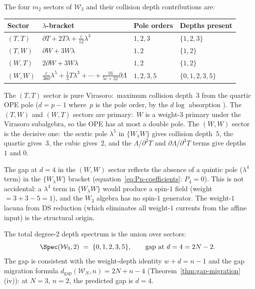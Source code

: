 \begin{computation}
\label{comp:w3-depth-degree-2}
%
The four $m_2$ sectors of $\mathcal{W}_3$ and their collision
depth contributions are:
\begin{center}
\small
\renewcommand{\arraystretch}{1.3}
\begin{tabular}{llll}
\toprule
\textbf{Sector} & \textbf{$\lambda$-bracket}
 & \textbf{Pole orders} & \textbf{Depths present} \\
\midrule
$(T,T)$ & $\partial T + 2T\lambda + \tfrac{c}{12}\lambda^3$
 & $1, 2, 3$ & $\{1, 2, 3\}$ \\
$(T,W)$ & $\partial W + 3W\lambda$
 & $1, 2$ & $\{1, 2\}$ \\
$(W,T)$ & $2\partial W + 3W\lambda$
 & $1, 2$ & $\{1, 2\}$ \\
$(W,W)$ & $\tfrac{c}{360}\lambda^5 + \tfrac{1}{3}T\lambda^3
 + \cdots + \tfrac{16}{5c+22}\partial\Lambda$
 & $1, 2, 3, 5$ & $\{0, 1, 2, 3, 5\}$ \\
\bottomrule
\end{tabular}
\end{center}

\noindent
The $(T,T)$ sector is pure Virasoro:\ maximum collision
depth~$3$ from the quartic OPE pole ($d = p - 1$ where~$p$
is the pole order, by the $d\log$ absorption ).
The $(T,W)$ and $(W,T)$ sectors
are primary:\ $W$ is a weight-$3$ primary under the
Virasoro subalgebra, so the OPE has at most a double pole.
The $(W,W)$ sector is the decisive one:\ the sextic pole
$\lambda^5$ in $\{W_\lambda W\}$ gives collision depth~$5$,
the quartic gives~$3$, the cubic gives~$2$, and the
$\Lambda$/$\partial^2 T$ and $\partial\Lambda$/$\partial^3 T$ terms give depths $1$ and $0$.

The gap at $d = 4$ in the $(W,W)$ sector reflects the
absence of a quintic pole ($\lambda^4$ term) in the
$\{W_\lambda W\}$ bracket
(equation~\eqref{eq:Pn-coefficients}: $P_4 = 0$). This
is not accidental: a $\lambda^4$ term in $\{W_\lambda W\}$
would produce a spin-$1$ field (weight $= 3 + 3 - 5 = 1$),
and the $W_3$ algebra has no spin-$1$ generator. The
weight-$1$ lacuna from DS reduction (which eliminates all
weight-$1$ currents from the affine input) is the
structural origin.

The total degree-$2$ depth spectrum is the union over sectors:
\begin{equation}
\label{eq:w3-spec-2}
\Spec(\mathcal{W}_3, 2)
\;=\; \{0, 1, 2, 3, 5\},
\qquad
\text{gap at } d = 4 = 2N - 2.
\end{equation}
The gap is consistent with the weight-depth identity $w + d = n - 1$ and the gap migration formula $d_{\mathrm{gap}}(\mathcal{W}_N, n) = 2N + n - 4$ (Theorem~\ref{thm:gap-migration}(iv)): at $N = 3$, $n = 2$, the predicted gap is $d = 4$.
\end{computation}

